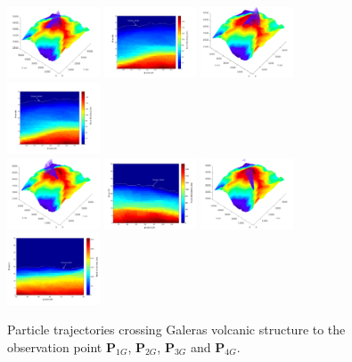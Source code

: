 \documentclass[letterpaper,10pt,titlepage,linenumber]{article}
\begin{document}
\begin{figure}[!ht]
\centering
\includegraphics[width=0.245\textwidth]{Figures/Paths1GAL}
\includegraphics[width=0.245\textwidth]{Figures/Distance2GAL}
\includegraphics[width=0.245\textwidth]{Figures/Paths2GAL}
\includegraphics[width=0.245\textwidth]{Figures/Distance2GAL}\\
\includegraphics[width=0.245\textwidth]{Figures/Paths3GAL}
\includegraphics[width=0.245\textwidth]{Figures/Distance3GAL}
\includegraphics[width=0.245\textwidth]{Figures/Paths4GAL}
\includegraphics[width=0.245\textwidth]{Figures/Distance4GAL}
	\caption{Particle trajectories crossing Galeras volcanic structure to the observation point {\bf P$_{1G}$}, {\bf P$_{2G}$}, {\bf P$_{3G}$} and {\bf P$_{4G}$}. }
  \label{DistanceTrajectoriesGaleras}
\end{figure}
\end{document}
